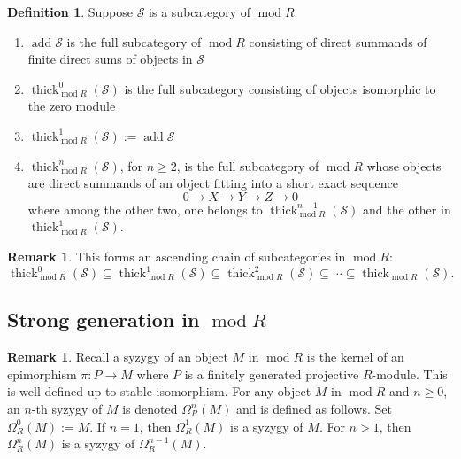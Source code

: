 \documentclass[11pt]{amsart}
\theoremstyle{plain}
\theoremstyle{definition}
\newtheorem{definition}[theorem]{Definition}
\newtheorem{remark}[theorem]{Remark}
\numberwithin{equation}{section}
\numberwithin{theorem}{section}
\begin{document}
\begin{definition}
    Suppose $\mathcal{S}$ is a subcategory of $\operatorname{mod}R$. 
    \begin{enumerate}
        \item $\operatorname{add}\mathcal{S}$ is the full subcategory of $\operatorname{mod}R$ consisting of direct summands of finite direct sums of objects in $\mathcal{S}$
        \item $\operatorname{thick}_{\operatorname{mod}R}^0(\mathcal{S})$ is the full subcategory consisting of objects isomorphic to the zero module
        \item $\operatorname{thick}_{\operatorname{mod}R}^1(\mathcal{S}) := \operatorname{add}\mathcal{S}$
        \item $\operatorname{thick}_{\operatorname{mod}R}^n(\mathcal{S})$, for $n\geq 2$, is the full subcategory of $\operatorname{mod}R$ whose objects are direct summands of an object fitting into a short exact sequence
        \begin{displaymath}
            0 \to X \to Y \to Z \to 0
        \end{displaymath}
        where among the other two, one belongs to $\operatorname{thick}_{\operatorname{mod}R}^{n-1}(\mathcal{S})$ and the other in $\operatorname{thick}_{\operatorname{mod}R}^1(\mathcal{S})$. 
    \end{enumerate}
\end{definition}
    
\begin{remark}
    This forms an ascending chain of subcategories in $\operatorname{mod}R$:
    \begin{displaymath}
        \operatorname{thick}_{\operatorname{mod}R}^0 (\mathcal{S}) \subseteq \operatorname{thick}_{\operatorname{mod}R}^1 (\mathcal{S}) \subseteq \operatorname{thick}_{\operatorname{mod}R}^2(\mathcal{S}) \subseteq \cdots \subseteq \operatorname{thick}_{\operatorname{mod}R}(\mathcal{S}).
    \end{displaymath}
\end{remark}

\subsection{Strong generation in \texorpdfstring{$\operatorname{mod}R$}{}}
\label{sec:extension_construction}

\begin{remark}
    Recall a syzygy of an object $M$ in $\operatorname{mod}R$ is the kernel of an epimorphism $\pi \colon P \to M$ where $P$ is a finitely generated projective $R$-module. This is well defined up to stable isomorphism. For any object $M$ in $\operatorname{mod}R$ and $n \geq 0$, an $n$-th syzygy of $M$ is denoted $\Omega^n_R (M)$ and is defined as follows. Set $\Omega^0_R (M):= M$. If $n=1$, then $\Omega^1_R (M)$ is a syzygy of $M$. For $n>1$, then $\Omega^n_R (M)$ is a syzygy of $\Omega^{n-1}_R (M)$.
\end{remark}
\end{document}
